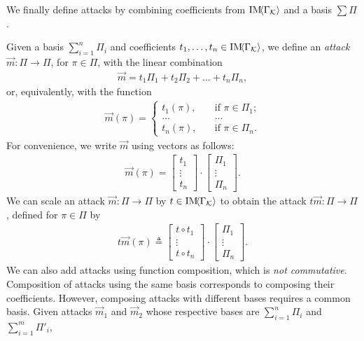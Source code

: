 {{We finally define attacks by combining coefficients from $\text{IM}\!{{\left<\Gamma_{\mathcal{K}}\right>}}$ and a basis $\sum\Pi$.
\begin{definition}[Attack]
  \label{def:Attack}
Given a basis $\sum_{i=1}^n\Pi_i$ and coefficients $t_1, \ldots, t_n\in\text{IM}\!{{\left<\Gamma_{\mathcal{K}}\right>}}$, 
we define an \emph{attack} $\vec{m}\colon \Pi\rightarrow \Pi$, for $\pi\in \Pi$, with the linear combination
\begin{align}
  \vec{m}=t_1\Pi_1 + t_2\Pi_2 + \ldots + t_n\Pi_n,
\end{align} 
or, equivalently, with the function
\begin{align}
  \label{eq:AttackVector}
  \vec{m}(\pi)=
    \begin{cases}
      t_1(\pi), &\quad\text{if $\pi\in \Pi_1$;}\\
      \ldots&\quad\ldots\\
      t_n(\pi), &\quad\text{if $\pi\in \Pi_n$.}
    \end{cases}
\end{align}
For convenience, we write $\vec{m}$ using vectors as follows: 
\begin{align}
  \vec{m}(\pi)=
  \begin{bmatrix}
    t_{1} \\
    \vdots \\
    t_{n}
  \end{bmatrix}
  \cdot
  \begin{bmatrix}
    \Pi_{1} \\
    \vdots \\
    \Pi_{n}
  \end{bmatrix}.
\end{align} 
We can scale an attack $\vec{m}\colon \Pi\rightarrow \Pi$ by $t\in \text{IM}\!{{\left<\Gamma_{\mathcal{K}}\right>}}$ to obtain the attack $t\vec{m}\colon \Pi\rightarrow \Pi$, defined for $\pi\in \Pi$ by
\begin{align}
  t\vec{m}(\pi)\triangleq
  \begin{bmatrix}
    t\circ t_{1} \\
    \vdots \\
    t\circ t_{n}
  \end{bmatrix}
  \cdot
  \begin{bmatrix}
    \Pi_{1} \\
    \vdots \\
    \Pi_{n}
  \end{bmatrix}.
\end{align} 
We can also add attacks using function composition, which is \emph{not commutative}. Composition of attacks using the same basis corresponds to composing their coefficients. However, composing attacks with different bases requires a common basis. Given attacks $\vec{m}_1$ and $\vec{m}_2$ whose respective bases are $\sum_{i=1}^n\Pi_i$ and $\sum_{i=1}^m\Pi'_i$, 

\end{definition}}}
